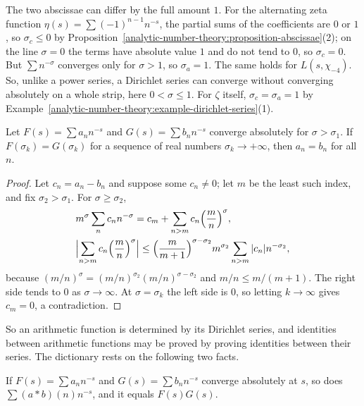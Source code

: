 \begin{counterexample}\label{analytic-number-theory:counterexample-abscissae}
The two abscissae can differ by the full amount $1$. For the alternating zeta function $\eta(s) = \sum(-1)^{n-1}n^{-s}$, the partial sums of the coefficients are $0$ or $1$, so $\sigma_c \leq 0$ by
Proposition~\ref{analytic-number-theory:proposition-abscissae}(2); on the line $\sigma = 0$ the terms have absolute value $1$ and do not tend to $0$, so $\sigma_c = 0$. But $\sum n^{-\sigma}$ converges only
for $\sigma > 1$, so $\sigma_a = 1$. The same holds for $L(s, \chi_{-4})$. So, unlike a power series, a Dirichlet series can converge without converging absolutely on a whole strip, here
$0 < \sigma \leq 1$. For $\zeta$ itself, $\sigma_c = \sigma_a = 1$ by Example~\ref{analytic-number-theory:example-dirichlet-series}(1).
\end{counterexample}

\begin{proposition}[Uniqueness]\label{analytic-number-theory:proposition-uniqueness}
Let $F(s) = \sum a_nn^{-s}$ and $G(s) = \sum b_nn^{-s}$ converge absolutely for $\sigma > \sigma_1$. If $F(\sigma_k) = G(\sigma_k)$ for a sequence of real numbers $\sigma_k \to +\infty$, then
$a_n = b_n$ for all $n$.
\end{proposition}

\begin{proof}
Let $c_n = a_n - b_n$ and suppose some $c_n \neq 0$; let $m$ be the least such index, and fix $\sigma_2 > \sigma_1$. For $\sigma \geq \sigma_2$,
\[
\begin{aligned}
&m^\sigma\sum_nc_nn^{-\sigma} = c_m + \sum_{n > m}c_n\Bigl(\frac mn\Bigr)^\sigma, \\
&\Bigl|\sum_{n > m}c_n\Bigl(\frac mn\Bigr)^\sigma\Bigr| \leq \Bigl(\frac{m}{m + 1}\Bigr)^{\sigma - \sigma_2}m^{\sigma_2}\sum_{n > m}|c_n|n^{-\sigma_2},
\end{aligned}
\]
because $(m/n)^\sigma = (m/n)^{\sigma_2}(m/n)^{\sigma - \sigma_2}$ and $m/n \leq m/(m + 1)$. The right side tends to $0$ as $\sigma \to \infty$. At $\sigma = \sigma_k$ the left side is $0$, so letting
$k \to \infty$ gives $c_m = 0$, a contradiction.
\end{proof}

So an arithmetic function is determined by its Dirichlet series, and identities between arithmetic functions may be proved by proving identities between their series. The dictionary rests on the
following two facts.

\begin{proposition}\label{analytic-number-theory:proposition-product}
If $F(s) = \sum a_nn^{-s}$ and $G(s) = \sum b_nn^{-s}$ converge absolutely at $s$, so does $\sum(a * b)(n)n^{-s}$, and it equals $F(s)G(s)$.
\end{proposition}

